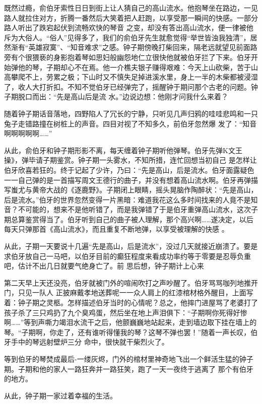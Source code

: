 \documentclass{article}
\begin{document}
既然过瘾，俞伯牙索性日日到街上让人猜自己的高山流水。他抱琴坐在路边，一见路人就拉住对方，折腾一番然后大笑着把人赶跑，以享受那一瞬间的快感。一部分路人听出了跌宕起伏到流畅欢快的琴音
\newpage
之变，却没有答出高山流水，便一律被他斥为大俗人。“俗人”见得多了，我们的俞伯牙先生就愈觉得“举世皆浊我独清”，居然渐有“英雄寂寞”、“知音难求”之感。钟子期傍晚打柴回来，隔老远就望见前面路旁有个很猥亵的身影抱着琴如思妇般幽怨地仁立很快他就被伯牙拦了下来。伯牙开始弹他的琴，子期却心不在焉。他一介樵夫银子赚得艰难：今天上山砍柴，苦于山高攀爬不上，劳累之极；下山时又不慎失足掉进溪水里，身上一半的木柴都被浸湿了，收人大打折扣。不知不觉伯牙已经弹完了，摇醒钟于期问那个古老的问题。钟子期脱口而出：“先是高山后是流
水。”边说边想：他刚才问我什么来着？ 

随着钟子期话音落地，四野陷人了冗长的宁静，只听见几声归鸦的哇哇悲鸣和一只兔子走错路撞在树桩上的声音。四目对视了不知多久，前伯牙忽然爆
发了：“知音啊啊啊啊啊……” 

从此，俞伯牙和钟子期形影不离，每天缠着钟子期听他弹琴。伯牙先弹K文王操》，弹毕请子期鉴赏。钟子期一头雾水，不知所措，连忙回想当初自己
\newpage
是怎样让伯牙欣喜若狂的。终于记起了少许，乃曰：“先是高山，后是流水。伯牙面露疑色一一自己弹的是一首描写周文王德行的曲子，并没有想着高山流水啊。伯牙再弹描写蚩尤与黄帝大战的《逐鹿野》。子期闭上眼睛，摇头晃脑作陶醉状：“先是高山，后是流水。”伯牙的世界忽然变得一片黑暗：难道我花这么多时间找来的人竟不是知音？不可能的，想来不是他听错了，而是我弹错了于是伯牙重弹高山流水，这次子期总算鉴赏得当了。伯牙听到自己的曲子被人理解，那个高兴啊……遂决定，以后每天只弹那首《高山流水》，而且重复不断地弹，以享受被理解的快感
。 

从此，子期一天要说十几遍“先是高山，后是流水”，没过几天就接近崩溃了。要是求伯牙放自己一马吧，以伯牙目前的癫狂程度来看成功率约等于零要是忍辱负重吧，估计不出几日就要气绝身亡了。前
思后想，钟子期计上心来 

第二天早上天还没亮，伯牙就被门外的喧闹吹打之声吵醒了。伯牙骂骂咖列地推开门，只见一队人
\newpage
正披麻戴孝地送葬呢一一众人肩上的红漆棺材格外醒目，上面写着：钟子期之灵柩。怎样描述伯牙当时的心情呢？总之，他摔门进屋骂了老婆打了孩子杀了三只鸡扔了九个臭鸡蛋，然后坐在地上声泪俱下：“子期啊你死得好惨啊……”等到声嘶力竭泪水流干之后，他颤巍巍地站起来，走到墙边取下挂在墙上的琴。“子期啊，你走了，还有谁听得懂我的琴？这琴不弹也罢！”随着一声长叹，伯牙手中的琴远射壁炉三分
命中，很快就干柴烈火了。 

等到伯牙的琴焚成最后-一缕灰烬，门外的棺材里神奇地飞出一个鲜活生猛的钟子期。子期和他的家人一路狂奔并一路狂笑，跑了一天一夜终于逃离了
那个有伯牙的地方。 

从此，钟子期一家过着幸福的生活。
\end{document}
